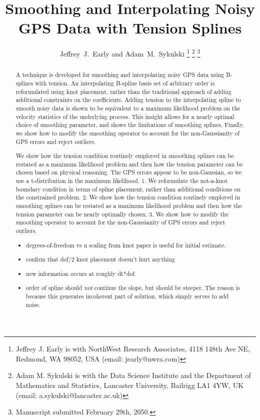 \documentclass[10pt,journal]{IEEEtran}
\begin{document}
\title{Smoothing and Interpolating Noisy GPS Data with Tension Splines}

\author{Jeffrey~J.~Early and Adam~M.~Sykulski%
\thanks{Jeffrey J. Early is with NorthWest Research Associates, 4118 148th Ave NE, Redmond, WA 98052, USA (email: jearly@nwra.com) } %
\thanks{Adam M. Sykulski is with the Data Science Institute and the Department of Mathematics and Statistics, Lancaster University, Bailrigg LA1 4YW, UK (email: a.sykulski@lancaster.ac.uk)}%
\thanks{Manuscript submitted February 29th, 2050.} }



\maketitle

\begin{abstract}
A technique is developed for smoothing and interpolating noisy GPS data using B-splines with tension. An interpolating B-spline basis set of arbitrary order is reformulated using knot placement, rather than the traditional approach of adding additional constraints on the coefficients. Adding tension to the interpolating spline to smooth noisy data is shown to be equivalent to a maximum likelihood problem on the velocity statistics of the underlying process. This insight allows for a nearly optimal choice of smoothing parameter, and shows the limitations of smoothing splines. Finally, we show how to modify the smoothing operator to account for the non-Gaussianity of GPS errors and reject outliers.


We show how the tension condition routinely employed in smoothing splines can be restated as a maximum likelihood problem and then how the tension parameter can be chosen based on physical reasoning. The GPS errors appear to be non-Gaussian, so we use a t-distribution in the maximum likelihood.
1. We reformulate the not-a-knot boundary condition in terms of spline placement, rather than additional conditions on the constrained problem.
2. We show how the tension condition routinely employed in smoothing splines can be restated as a maximum likelihood problem and then how the tension parameter can be nearly optimally chosen.
3. We show how to modify the smoothing operator to account for the non-Gaussianity of GPS errors and reject outliers.
\begin{itemize}
    \item degrees-of-freedom vs u scaling from knot paper is useful for initial estimate.
    \item confirm that dof/2 knot placement doesn't hurt anything
    \item new information occurs at roughly dt*dof.
    \item order of spline should \emph{not} continue the slope, but should be steeper. The reason is because this generates incoherent part of solution, which simply serves to add noise.
\end{itemize}
\end{abstract}
\end{document}
